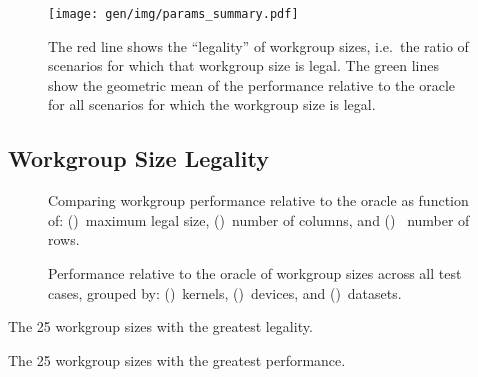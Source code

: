 \begin{figure}
\centering
\texttt{[image: gen/img/params\_summary.pdf]}
\caption{%
  The red line shows the ``legality'' of workgroup sizes, i.e.\ the
  ratio of scenarios for which that workgroup size is legal.  The
  green lines show the geometric mean of the performance relative to
  the oracle for all scenarios for which the workgroup size is legal.%
}
\label{fig:performance-legality}
\end{figure}


\subsection{Workgroup Size Legality}


\cleardoublepage
\begin{figure}

\caption{%
  Comparing workgroup performance relative to the oracle as function
  of: ()~maximum legal size,
  ()~number of columns, and
  ()~ number of rows.%
}
\label{fig:performance-wgsizes}
\end{figure}
\newpage
\begin{figure}

\caption{%
  Performance relative to the oracle of workgroup sizes across all
  test cases, grouped by: ()~kernels,
  ()~devices, and
  ()~datasets.%
}
\label{fig:performances}
\end{figure}

%


\begin{table}
  \parbox{.45\linewidth}{
    \centering
    \scriptsize
    
    \caption{The 25 workgroup sizes with the greatest legality.}
  }
  \hfill
  \parbox{.45\linewidth}{
    \centering
    \scriptsize
    
    \caption{The 25 workgroup sizes with the greatest performance.}
  }
\end{table}



